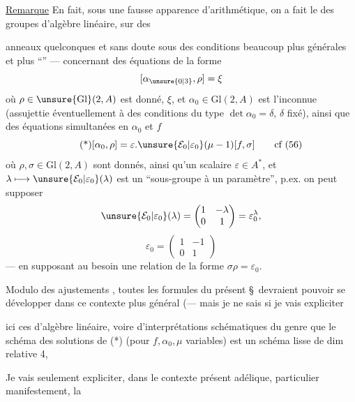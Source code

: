 \uline{Remarque} En fait, sous une fausse apparence d'arithmétique, on a fait  le  des groupes d'algèbre linéaire,  sur des



anneaux quelconques et  sans doute sous des conditions beaucoup plus générales et plus ``'' --- concernant des équations de la forme
\[
[\alpha_{\unsure{0|3}},\rho]=\xi
\]
où $\rho\in\unsure{\mathrm{Gl}}(2,A)$ est donné,  $\xi$, et
$\alpha_0\in\mathrm{Gl}(2,A)$ est l'inconnue (assujettie éventuellement à des conditions du type $\det\alpha_0=\delta$, $\delta$ fixé), ainsi que des équations simultanées en $\alpha_0$ et $f$
\[
\tag{*}
[\alpha_0,\rho]=\varepsilon.\unsure{\mathcal{E}_0|\varepsilon_0}(\mu-1)[f,\sigma]
\qquad\text{cf (56)}
\]
où $\rho,\sigma\in\mathrm{Gl}(2,A)$ sont donnés, ainsi qu'un scalaire $\varepsilon\in A^*$, et
$\lambda\longmapsto\unsure{\mathcal{E}_0|\varepsilon_0}(\lambda)$ est un ``sous-groupe à un paramètre'', p.ex. on peut supposer
\[
\unsure{\mathcal{E}_0|\varepsilon_0}(\lambda)=\begin{pmatrix}1&-\lambda\\0&1\end{pmatrix}=\varepsilon_0^\lambda,
\]
\[
\varepsilon_0=\begin{pmatrix}1&-1\\0&1\end{pmatrix}
\]
--- en supposant au besoin une relation de la forme $\sigma\rho=\varepsilon_0$.

Modulo des ajustements , toutes les formules du présent \S\ devraient pouvoir se développer dans ce contexte plus général
(--- mais je ne sais si je vais expliciter



ici ces   d'algèbre linéaire,
voire d'interprétations schématiques du genre que le schéma des solutions de (*)
(pour $f,\alpha_0,\mu$ variables) est un schéma  lisse de dim relative 4, 

Je vais seulement expliciter, dans le contexte présent adélique,  particulier manifestement, la

